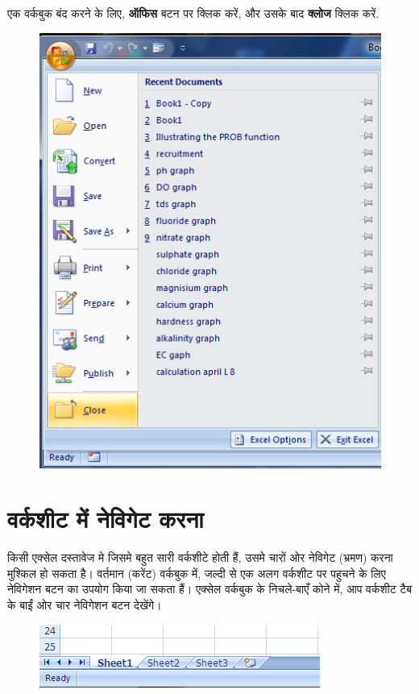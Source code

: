 एक वर्कबुक बंद करने के लिए, \textbf{ऑफिस} बटन पर क्लिक करें, और उसके बाद \textbf{क्लोज} क्लिक करें.				

\begin{figure}[H]
\centering
\includegraphics[scale=0.3]{src/images/chapter1/chapter1_fig26.png}
\end{figure}				

\section{वर्कशीट में नेविगेट करना}\label{id-1.14}

किसी एक्सेल दस्तावेज मे जिसमे बहुत सारी वर्कशीटे होती हैं, उसमे चारों ओर नेविगेट (भ्रमण) करना मुश्किल हो सकता है। वर्तमान (करेंट) वर्कबुक में, जल्दी से एक अलग वर्कशीट पर पहुचने के लिए नेविगेशन बटन का उपयोग किया जा सकता हैं। एक्सेल वर्कबुक के निचले-बाएँ कोने में, आप वर्कशीट टैब के बाईं ओर चार नेविगेशन बटन देखेंगे।

\begin{figure}[H]
\centering
\includegraphics[scale=0.45]{src/images/chapter1/chapter1_fig27.png}
\end{figure}

